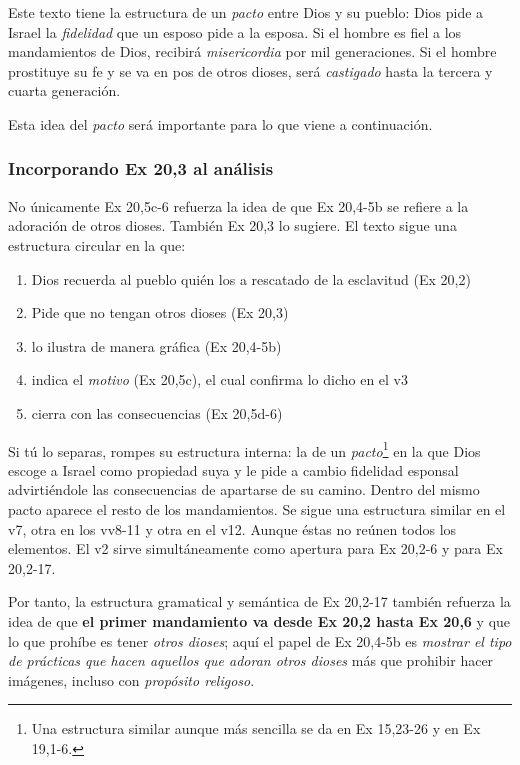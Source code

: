 \documentclass{article}
\begin{document}
Este texto tiene la estructura de un \emph{pacto} entre Dios y su pueblo: Dios pide a Israel la \emph{fidelidad} que un esposo pide a la esposa. Si el hombre es fiel a los mandamientos de Dios, recibir\'a \emph{misericordia} por mil generaciones. Si el hombre prostituye su fe y se va en pos de otros dioses, ser\'a \emph{castigado} hasta la tercera y cuarta generaci\'on.

Esta idea del \emph{pacto} ser\'a importante para lo que viene a continuaci\'on.

\subsubsection{Incorporando Ex 20,3 al an\'alisis}

No \'unicamente Ex 20,5c-6 refuerza la idea de que Ex 20,4-5b se refiere a la adoraci\'on de otros dioses. Tambi\'en Ex 20,3 lo sugiere. El texto sigue una estructura circular en la que:

\begin{enumerate}
\item Dios recuerda al pueblo qui\'en los a rescatado de la esclavitud (Ex 20,2)
\item Pide que no tengan otros dioses (Ex 20,3)
\item lo ilustra de manera gr\'afica (Ex 20,4-5b)
\item indica el \emph{motivo} (Ex 20,5c), el cual confirma lo dicho en el v3
\item cierra con las consecuencias (Ex 20,5d-6)
\end{enumerate}

\noindent
Si t\'u lo separas, rompes su estructura interna: la de un \emph{pacto}\footnote{Una estructura similar aunque m\'as sencilla se da en Ex 15,23-26 y en Ex 19,1-6.} en la que Dios escoge a Israel como propiedad suya y le pide a cambio fidelidad esponsal advirti\'endole las consecuencias de apartarse de su camino. Dentro del mismo pacto aparece el resto de los mandamientos. Se sigue una estructura similar en el v7, otra en los vv8-11 y otra en el v12. Aunque \'estas no re\'unen todos los elementos. El v2 sirve simult\'aneamente como apertura para Ex 20,2-6 y para Ex 20,2-17.

Por tanto, la estructura gramatical y sem\'antica de Ex 20,2-17 tambi\'en refuerza la idea de que \textbf{el primer mandamiento va desde Ex 20,2 hasta Ex 20,6} y que lo que proh\'{i}be es tener \emph{otros dioses}; aqu\'{i} el papel de Ex 20,4-5b es \emph{mostrar el tipo de pr\'acticas que hacen aquellos que adoran otros dioses} m\'as que prohibir hacer im\'agenes, incluso con \emph{prop\'osito religoso}.
\end{document}
